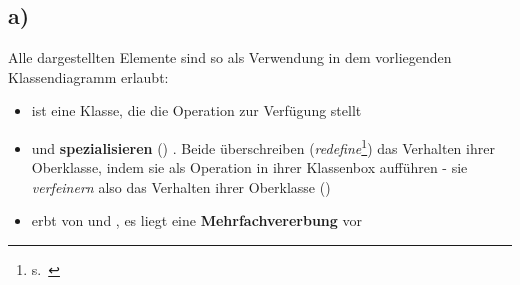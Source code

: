\subsection*{a)}

Alle dargestellten Elemente sind so als Verwendung in dem vorliegenden Klassendiagramm erlaubt:

\begin{itemize}
    \item {} ist eine Klasse, die die Operation  zur Verfügung stellt
    \item {} und  \textbf{spezialisieren} (\cite[52]{Bal05}) .
    Beide überschreiben (\textit{redefine}\footnote{
    s.~\cite[100]{OMG17}
    }) das Verhalten ihrer Oberklasse, indem sie  als Operation in ihrer Klassenbox aufführen - sie \textit{verfeinern} also das Verhalten ihrer Oberklasse (\cite[54]{Bal05})
    \item {} erbt von  und , es liegt eine \textbf{Mehrfachvererbung} vor
\end{itemize}